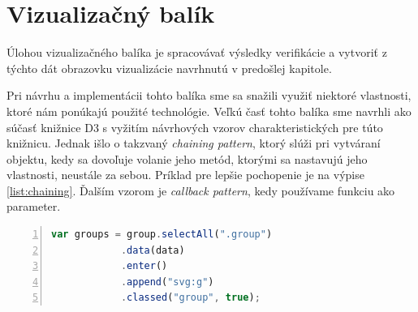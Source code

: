 \section{Vizualizačný balík}
Úlohou vizualizačného balíka je spracovávať výsledky verifikácie a vytvoriť z týchto dát obrazovku vizualizácie navrhnutú v predošlej kapitole. 

Pri návrhu a implementácii tohto balíka sme sa snažili využiť niektoré vlastnosti, ktoré nám ponúkajú použité technológie. Veľkú časť tohto balíka sme navrhli ako súčasť knižnice D3 s vyžitím návrhových vzorov charakteristických pre túto knižnicu. Jednak išlo o takzvaný \textit{chaining pattern}, ktorý slúži pri vytváraní objektu, kedy sa dovoľuje volanie jeho metód, ktorými sa nastavujú jeho vlastnosti, neustále za sebou. Príklad pre lepšie pochopenie je na výpise \ref{list:chaining}.
Ďalším vzorom je \textit{callback pattern}, kedy používame funkciu ako parameter. 


\begin{lstlisting}[frame=solid, backgroundcolor=\color{bg}, basicstyle=\footnotesize\ttfamily, language=JavaScript, numbers=left, numberstyle=\tiny\color{black}, caption=Ukážka aplikácie návrhového vzoru \textit{chainning}., captionpos=b, label=list:chaining]
var groups = group.selectAll(".group")
		    .data(data)
		    .enter()
		    .append("svg:g")
		    .classed("group", true);	
\end{lstlisting}


